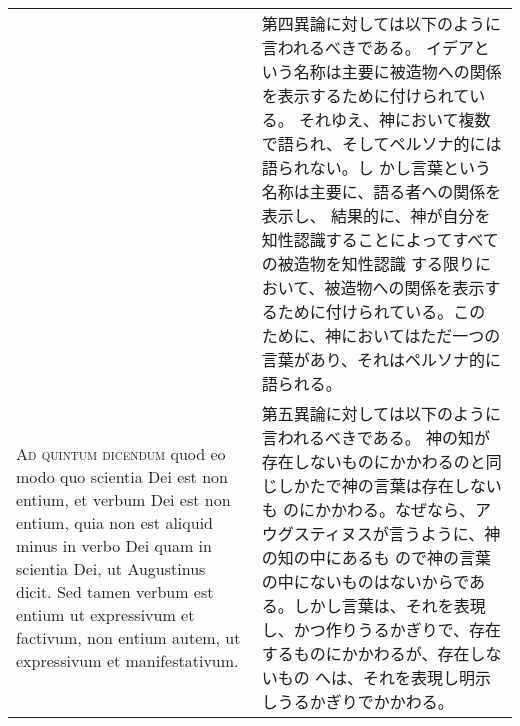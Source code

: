 \documentclass[10pt]{jsarticle} %
\begin{document}
\begin{longtable}{p{21em}p{21em}}
&

第四異論に対しては以下のように言われるべきである。
イデアという名称は主要に被造物への関係を表示するために付けられている。
 それゆえ、神において複数で語られ、そしてペルソナ的には語られない。し
 かし言葉という名称は主要に、語る者への関係を表示し、
 結果的に、神が自分を知性認識することによってすべての被造物を知性認識
 する限りにおいて、被造物への関係を表示するために付けられている。この
 ために、神においてはただ一つの言葉があり、それはペルソナ的に語られる。

\\



{\scshape Ad quintum dicendum} quod eo modo quo scientia Dei est non entium, et
verbum Dei est non entium, quia non est aliquid minus in verbo Dei
quam in scientia Dei, ut Augustinus dicit. Sed tamen verbum est entium
ut expressivum et factivum, non entium autem, ut expressivum et
manifestativum.

&

第五異論に対しては以下のように言われるべきである。
神の知が存在しないものにかかわるのと同じしかたで神の言葉は存在しないも
 のにかかわる。なぜなら、アウグスティヌスが言うように、神の知の中にあるも
 ので神の言葉の中にないものはないからである。しかし言葉は、それを表現
 し、かつ作りうるかぎりで、存在するものにかかわるが、存在しないもの
 へは、それを表現し明示しうるかぎりでかかわる。


\end{longtable}
\newpage
\end{document}
